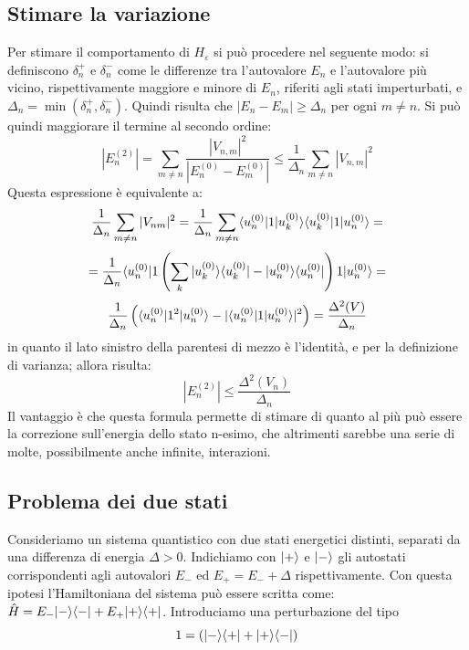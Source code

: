 \subsection{Stimare la variazione}
Per stimare il comportamento di $H_\varepsilon$  si può procedere nel seguente modo: si definiscono $\delta_n^+$ e $\delta_n^-$ come le differenze tra l'autovalore $E_n$ e l'autovalore più vicino, rispettivamente maggiore e minore di $E_n$, riferiti agli stati imperturbati, e $\Delta_n = \min(\delta_n^+, \delta_n^-)$. Quindi risulta che $|E_n - E_m| \geq \Delta_n$ per ogni $m \neq n$.
Si può quindi maggiorare il termine al secondo ordine:
\[
	|E_n^{(2)}| = \sum_{m \neq n} \frac{|V_{n,m}|^2}{|E_n^{(0)} - E_m^{(0)}|} \leq \frac{1}{\Delta_n} \sum_{m \neq n} |V_{n,m}|^2
\]
Questa espressione è equivalente a:
\[
	\inv{\Delta_n} \sum_{m \neq n} |V_{nm}|^2 = \inv{\Delta_n} \sum_{m \neq n} \Bra {u_n^{(0)}} \V \Ket {u_k^{(0)}}\Bra {u_k^{(0)}} \V \Ket {u_n^{(0)}} = \]\[
	= \inv{\Delta_n} \Bra {u_n^{(0)}} \V \l \sum_k \ketbrabra{u_k^{(0)}} - \ketbrabra{u_n^{(0)}} \r \V \Ket {u_n^{(0)}} = \]\[
	 \inv{\Delta_n} \left( \bra u_n^{(0)}| \V^2 |u_n^{(0)}\ket - |\bra u_n^{(0)}| \V |u_n^{(0)}\ket|^2 \right) = \frac{\Delta^2(V)}{\Delta_n}
\]
in quanto il lato sinistro della parentesi di mezzo è l'identità, e per la definizione di varianza; allora risulta:
\[
	|E_n^{(2)}| \leq \frac{\Delta^2(V_n)}{\Delta_n}
\]
Il vantaggio è che questa formula permette di stimare di quanto al più può essere la correzione sull'energia dello stato n-esimo, che altrimenti sarebbe una serie di molte, possibilmente anche infinite, interazioni.

\subsection{Problema dei due stati}
Consideriamo un sistema quantistico con due stati energetici distinti, separati da una differenza di energia $\Delta > 0$. Indichiamo con $\Ket{+}$ e $\Ket{-}$ gli autostati corrispondenti agli autovalori $E_-$ ed $E_+ = E_- + \Delta$ rispettivamente. Con questa ipotesi l'Hamiltoniana del sistema può essere scritta come: \(\H = E_- \ketbra{-}{-} + E_+ \ketbra{+}{+}\). Introduciamo una perturbazione del tipo
\[
	\V = (\ketbra{-}{+} + \ketbra{+}{-})
\]

